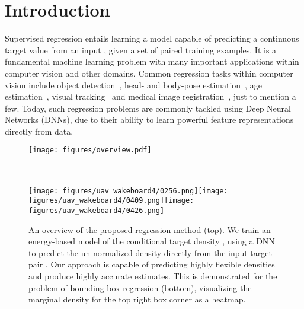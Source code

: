 \documentclass[runningheads]{llncs}
\begin{document}
\section{Introduction}
\label{section:introduction}

Supervised regression entails learning a model capable of predicting a continuous target value  from an input , given a set of paired training examples. It is a fundamental machine learning problem with many important applications within computer vision and other domains. Common regression tasks within computer vision include object detection~\cite{Ren2015FasterRT,jiang2018acquisition,law2018cornernet,zhou2019bottom}, head- and body-pose estimation~\cite{cao2017realtime,xiao2018simple,sun2019deep,yang2019fsa}, age estimation~\cite{rothe2016deep,pan2018mean,cao2019consistent}, visual tracking~\cite{MDNet,DaSiamRPN,SiamRPN++,danelljan2019atom} and medical image registration~\cite{niethammer2011geodesic,chou20132d}, just to mention a few. Today, such regression problems are commonly tackled using Deep Neural Networks (DNNs), due to their ability to learn powerful feature representations directly from data.

\begin{figure}[t]
\centering
   \texttt{[image: figures/overview.pdf]}\vspace{-2mm}
   \begin{tabular}{@{}p{\columnwidth}@{}}
        \\\hline
   \end{tabular}\vspace{3mm}\\
   \newcommand{\imwid}{0.2595\columnwidth}\texttt{[image: figures/uav\_wakeboard4/0256.png]}\hspace{2mm}\texttt{[image: figures/uav\_wakeboard4/0409.png]}\hspace{2mm}\texttt{[image: figures/uav\_wakeboard4/0426.png]}\caption{An overview of the proposed regression method (top). We train an energy-based model  of the conditional target density , using a DNN  to predict the un-normalized density directly from the input-target pair . Our approach is capable of predicting highly flexible densities and produce highly accurate estimates. This is demonstrated for the problem of bounding box regression (bottom), visualizing the marginal density for the top right box corner as a heatmap.
   }\label{fig:intro_fig}
\end{figure}
\end{document}
